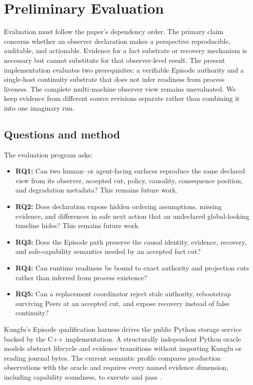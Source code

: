 \section{Preliminary Evaluation}
\label{sec:evaluation}

Evaluation must follow the paper's dependency order. The primary claim concerns
whether an observer declaration makes a perspective reproducible, auditable,
and actionable. Evidence for a fact substrate or recovery mechanism is
necessary but cannot substitute for that observer-level result. The present
implementation evaluates two prerequisites: a verifiable Episode authority and
a single-host continuity substrate that does not infer readiness from process
liveness. The complete multi-machine observer view remains unevaluated. We keep
evidence from different source revisions separate rather than combining it into
one imaginary run.

\subsection{Questions and method}

The evaluation program asks:

\begin{itemize}[leftmargin=*]
  \item \textbf{RQ1:} Can two human- or agent-facing surfaces reproduce the
        same declared view from its observer, accepted cut, policy, causality,
        consequence position, and degradation metadata? This remains future
        work.
  \item \textbf{RQ2:} Does declaration expose hidden ordering assumptions,
        missing evidence, and differences in safe next action that an
        undeclared global-looking timeline hides? This remains future work.
  \item \textbf{RQ3:} Does the Episode path preserve the causal identity,
        evidence, recovery, and safe-capability semantics needed by an accepted
        fact cut?
  \item \textbf{RQ4:} Can runtime readiness be bound to exact authority and
        projection cuts rather than inferred from process existence?
  \item \textbf{RQ5:} Can a replacement coordinator reject stale authority,
        rebootstrap surviving Peers at an accepted cut, and expose recovery
        instead of false continuity?
\end{itemize}

Kungfu's Episode qualification harness drives the public Python storage service
backed by the C++ implementation. A structurally independent Python oracle
models abstract lifecycle and evidence transitions without importing Kungfu or
reading journal bytes. The current semantic profile compares production
observations with the oracle and requires every named evidence dimension,
including capability soundness, to execute and pass
\cite{kungfu2026episode}.

